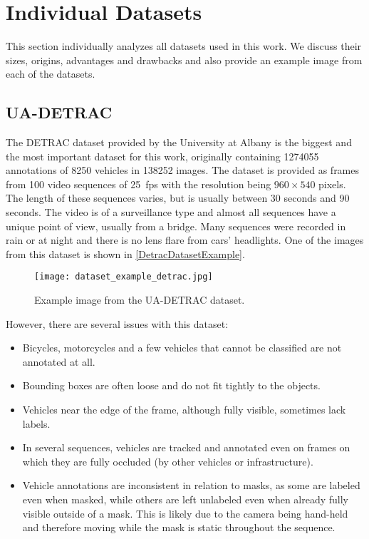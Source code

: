 \section{Individual Datasets}


This section individually analyzes all datasets used in this work. We discuss
their sizes, origins, advantages and drawbacks and also provide an example image
from each of the datasets.


\subsection{UA-DETRAC}
\label{DetracDataset}

The DETRAC dataset \cite{detrac} provided by the University at Albany is the
biggest and the most important dataset for this work, originally containing
\num{1274055} annotations of \num{8250} vehicles in \num{138252} images. The
dataset is provided as frames from 100 video sequences of \SI{25}{fps} with the
resolution being $960 \times 540$ pixels. The length of these sequences varies,
but is usually between 30 seconds and 90 seconds. The video is of a surveillance
type and almost all sequences have a unique point of view, usually from a
bridge. Many sequences were recorded in rain or at night and there is no lens
flare from cars' headlights. One of the images from this dataset is shown in
\autoref{DetracDatasetExample}.

\begin{figure}[h]
    \centering
    \texttt{[image: dataset\_example\_detrac.jpg]}
    \caption{Example image from the UA-DETRAC dataset.}
    \label{DetracDatasetExample}
\end{figure}

However, there are several issues with this dataset:
\begin{itemize}
    \item Bicycles, motorcycles and a few vehicles that cannot be classified are
    not annotated at all.
    \item Bounding boxes are often loose and do not fit tightly to the objects.
    \item Vehicles near the edge of the frame, although fully visible, sometimes
    lack labels.
    \item In several sequences, vehicles are tracked and annotated even on
    frames on which they are fully occluded (by other vehicles or
    infrastructure).
    \item Vehicle annotations are inconsistent in relation to masks, as some are
    labeled even when masked, while others are left unlabeled even when already
    fully visible outside of a mask. This is likely due to the camera being
    hand-held and therefore moving while the mask is static throughout the
    sequence.
\end{itemize}

